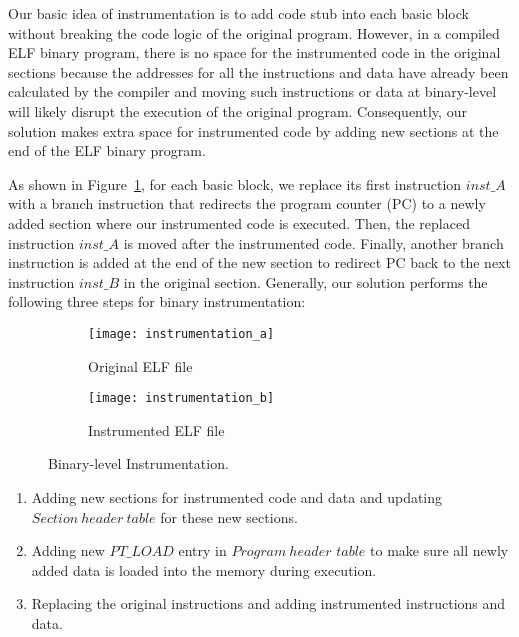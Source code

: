 Our basic idea of instrumentation is to add code stub into each basic block without breaking the code logic of the original program. However, in a compiled ELF binary program, there is no space for the instrumented code in the original sections because the addresses for all the instructions and data have already been calculated by the compiler and moving such instructions or data at binary-level will likely disrupt the execution of the original program. Consequently, our solution makes extra space for instrumented code by adding new sections at the end of the ELF binary program.

As shown in Figure~\ref{figs:instrumentation}, for each basic block, we replace its first instruction $inst\_A$ with a branch instruction that redirects the program counter (PC) to a newly added section where our instrumented code is executed. Then, the replaced instruction $inst\_A$ is moved after the instrumented code. Finally, another branch instruction is added at the end of the new section to redirect PC back to the next instruction $inst\_B$ in the original section. Generally, our solution performs the following three steps for binary instrumentation:

\begin{figure}[htbp]
\centering 
\begin{subfigure}[b]{0.20\textwidth}
\texttt{[image: instrumentation\_a]}
\caption{Original ELF file}
\end{subfigure}
\hspace{+8pt}
\begin{subfigure}[b]{0.20\textwidth}
\texttt{[image: instrumentation\_b]}
\caption{Instrumented ELF file}
\end{subfigure}
\caption{Binary-level Instrumentation.}
\label{figs:instrumentation}
\end{figure}

\begin{enumerate}
	\item Adding new sections for instrumented code and data and updating $Section\ header\ table$ for these new sections.
	\item Adding new $PT\_LOAD$ entry in $Program\ header$ $table$ to make sure all newly added data is loaded into the memory during execution.
	\item Replacing the original instructions and adding instrumented instructions and data.
\end{enumerate}

\vspace{5pt} 
